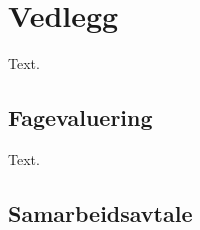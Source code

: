\section{Vedlegg}
Text.

\subsection{Fagevaluering}
Text.
\subsection{Samarbeidsavtale}
\label{Samarbeidsavtale - revurdert}